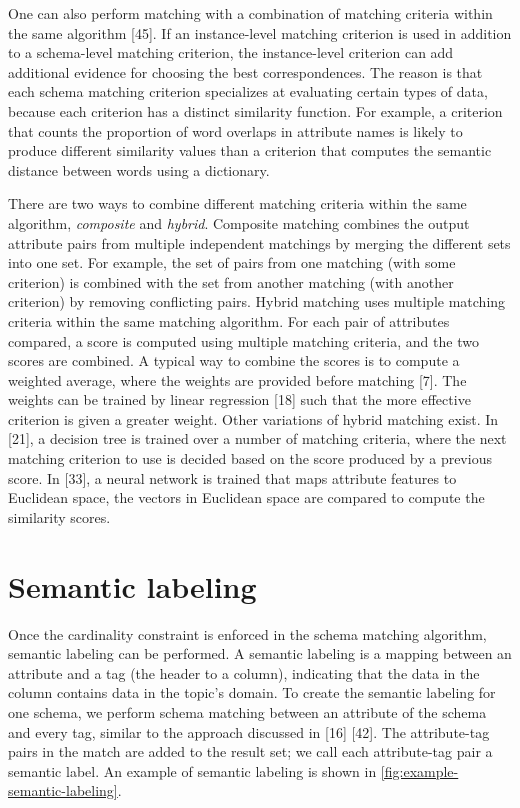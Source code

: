 One can also perform matching with a combination of matching criteria within the same algorithm \cite{Sorrentino2011NORMS}[45]. If an instance-level matching criterion is used in addition to a schema-level matching criterion, the instance-level criterion can add additional evidence for choosing the best correspondences. The reason is that each schema matching criterion specializes at evaluating certain types of data, because each criterion has a distinct similarity function. For example, a criterion that counts the proportion of word overlaps in attribute names is likely to produce different similarity values than a criterion that computes the semantic distance between words using a dictionary.

There are two ways to combine different matching criteria within the same algorithm, \textit{composite} and \textit{hybrid}. Composite matching combines the output attribute pairs from multiple independent matchings by merging the different sets into one set. For example, the set of pairs from one matching (with some criterion) is combined with the set from another matching (with another criterion) by removing conflicting pairs. Hybrid matching uses multiple matching criteria within the same matching algorithm. For each pair of attributes compared, a score is computed using multiple matching criteria, and the two scores are combined. A typical way to combine the scores is to compute a weighted average, where the weights are provided before matching \cite{DBLP:journals/debu/ChenGHTD18}[7]. The weights can be trained by linear regression \cite{Ehrig2004QOM}[18] such that the more effective criterion is given a greater weight. Other variations of hybrid matching exist. In \cite{Giunchiglia2005Semantic}[21], a decision tree is trained over a number of matching criteria, where the next matching criterion to use is decided based on the score produced by a previous score. In \cite{Moawed2018Arabian}[33], a neural network is trained that maps attribute features to Euclidean space, the vectors in Euclidean space are compared to compute the similarity scores.

\section{Semantic labeling}
\label{sec:SemanticLabeling}

Once the cardinality constraint is enforced in the schema matching algorithm, semantic labeling can be performed. A semantic labeling is a mapping between an attribute and a tag (the header to a column), indicating that the data in the column contains data in the topic's domain. To create the semantic labeling for one schema, we perform schema matching between an attribute of the schema and every tag, similar to the approach discussed in \cite{Dong2012Proceedings}[16] \cite{Salakhutdinov2009Semantic}[42]. The attribute-tag pairs in the match are added to the result set; we call each attribute-tag pair a semantic label. An example of semantic labeling is shown in \autoref{fig:example-semantic-labeling}.

